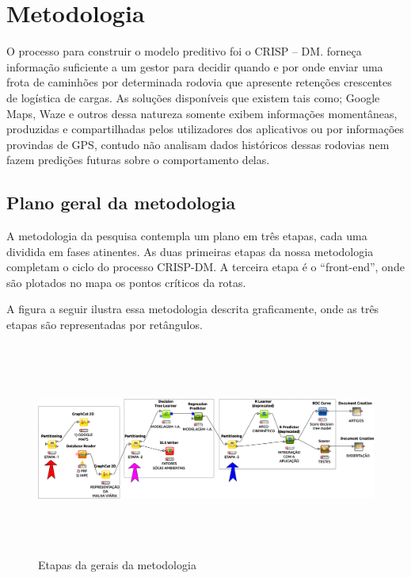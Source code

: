 \chapter{Metodologia}\label{meto}

O processo para construir o modelo preditivo foi o CRISP -- DM. forneça informação suficiente a um gestor para decidir quando e por onde 
enviar uma frota de caminhões por determinada rodovia que apresente retenções crescentes de logística de cargas. As soluções disponíveis que 
existem tais como; Google Maps, Waze e outros dessa natureza somente exibem informações momentâneas, produzidas e compartilhadas pelos utilizadores 
dos aplicativos ou por informações provindas de GPS, contudo não analisam dados históricos dessas rodovias nem fazem predições futuras sobre o 
comportamento delas. \\

\section{Plano geral da metodologia}

A metodologia da pesquisa contempla um plano em três etapas, cada uma dividida em fases atinentes.
As duas primeiras etapas da nossa metodologia completam o ciclo do processo CRISP-DM.
A terceira etapa é o ``front-end'', onde são plotados no mapa os pontos críticos da rotas.

\pagebreak

A figura a seguir ilustra essa metodologia descrita graficamente, onde as três etapas são representadas por retângulos.
 
\begin{figure}[ht]
\centering
\caption{Etapas da gerais da metodologia}
\includegraphics[width=160mm, height=70mm]{Figuras/BigData/Etapas.png}
\end{figure}

